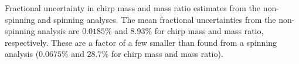 \label{fig:mass_std} Fractional uncertainty in chirp mass and mass ratio estimates from the non-spinning and spinning analyses.  The mean fractional uncertainties from the non-spinning analysis are $0.0185\%$ and $8.93\%$ for chirp mass and mass ratio, respectively.  These are a factor of a few smaller than found from a spinning analysis ($0.0675\%$ and $28.7\%$ for chirp mass and mass ratio).
  